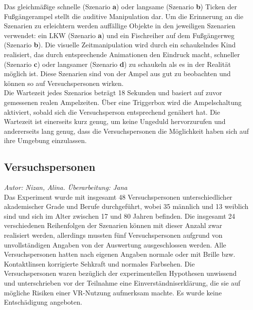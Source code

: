 \documentclass{Paper}
\begin{document}


Das gleichmäßige schnelle (Szenario \textbf{a}) oder langsame (Szenario \textbf{b}) Ticken der Fußgängerampel stellt die auditive Manipulation dar. Um die Erinnerung an die Szenarien zu erleichtern werden auffällige Objekte in den jeweiligen Szenarien verwendet: ein LKW (Szenario \textbf{a}) und ein Fischreiher auf dem Fußgängerweg (Szenario \textbf{b}).
Die visuelle Zeitmanipulation wird durch ein schaukelndes Kind realisiert, das durch entsprechende Animationen den Eindruck macht, schneller (Szenario \textbf{c}) oder langsamer (Szenario \textbf{d}) zu schaukeln als es in der Realität möglich ist. Diese Szenarien sind von der Ampel aus gut zu beobachten und können so auf Versuchspersonen wirken.\\
Die Wartezeit jedes Szenarios beträgt 18 Sekunden und basiert auf zuvor gemessenen realen Ampelzeiten. Über eine Triggerbox wird die Ampelschaltung aktiviert, sobald sich die Versuchsperson entsprechend genähert hat. Die Wartezeit ist einerseits kurz genug, um keine Ungeduld hervorzurufen und andererseits lang genug, dass die Versuchspersonen die Möglichkeit haben sich auf ihre Umgebung einzulassen. 

\subsection{Versuchspersonen}
        \textit{Autor: Nizan, Alina. Überarbeitung: Jana}\\
Das Experiment wurde mit insgesamt 48 Versuchspersonen unterschiedlicher akademischer Grade und Berufe  durchgeführt, wobei 35 männlich und 13 weiblich sind und sich im Alter zwischen 17 und 80 Jahren befinden.
Die insgesamt 24 verschiedenen Reihenfolgen der Szenarien können mit dieser Anzahl zwar realisiert werden, allerdings mussten fünf Versuchspersonen aufgrund von unvollständigen Angaben von der Auswertung ausgeschlossen werden. 
Alle Versuchspersonen hatten nach eigenen Angaben normale oder mit Brille bzw. Kontaktlinsen korrigierte Sehkraft und normales Farbsehen. Die Versuchspersonen waren bezüglich der experimentellen Hypothesen unwissend und unterschrieben vor der Teilnahme eine Einverständniserklärung, die sie auf mögliche Risiken einer VR-Nutzung aufmerksam machte. Es wurde keine Entschädigung angeboten. 
\end{document}
